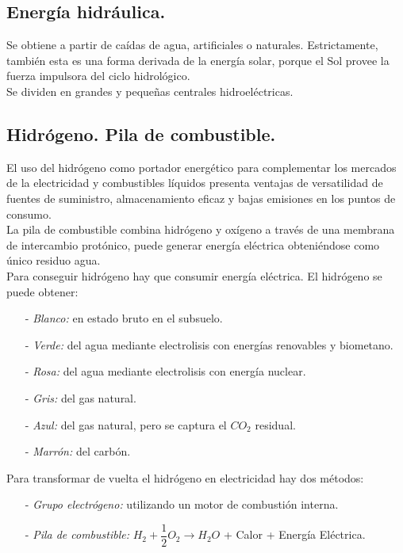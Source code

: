 			\subsection{Energía hidráulica.}
				Se obtiene a partir de caídas de agua, artificiales o naturales. Estrictamente, también esta es una forma derivada de la energía solar, porque el Sol provee la fuerza impulsora del ciclo hidrológico.\\
				\indent Se dividen en grandes y pequeñas centrales hidroeléctricas.
		
			\subsection{Hidrógeno. Pila de combustible.}
				El uso del hidrógeno como portador energético para complementar los mercados de la electricidad y
				combustibles líquidos presenta ventajas de versatilidad de fuentes de suministro, almacenamiento eficaz y
				bajas emisiones en los puntos de consumo.\\
				\indent La pila de combustible combina hidrógeno y oxígeno a través de una membrana de intercambio protónico,
				puede generar energía eléctrica obteniéndose como único residuo agua.\\
				\indent Para conseguir hidrógeno hay que consumir energía eléctrica. El hidrógeno se puede obtener:
				\begin{itemize}
					\item[-] \textit{Blanco:} en estado bruto en el subsuelo.
					\item[-] \textit{Verde:} del agua mediante electrolisis con energías renovables y biometano.
					\item[-] \textit{Rosa:} del agua mediante electrolisis con energía nuclear.
					\item[-] \textit{Gris:} del gas natural.
					\item[-] \textit{Azul:} del gas natural, pero se captura el $\textit{CO}_2$ residual.
					\item[-] \textit{Marrón:} del carbón.
				\end{itemize}
				Para transformar de vuelta el hidrógeno en electricidad hay dos métodos:
				\begin{itemize}
					\item[-] \textit{Grupo electrógeno:} utilizando un motor de combustión interna.
					\item[-] \textit{Pila de combustible:} $H_2 + \dfrac{1}{2}O_2 \longrightarrow H_2O$ + Calor + Energía Eléctrica.
				\end{itemize}
		
